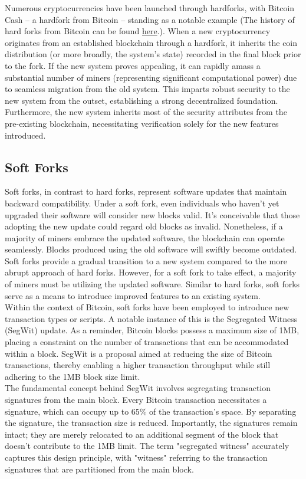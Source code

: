 Numerous cryptocurrencies have been launched through hardforks, with Bitcoin Cash – a hardfork from Bitcoin – standing as a notable example (The history of hard forks from Bitcoin can be found \href{https://www.investopedia.com/tech/history-bitcoin-hard-forks/}{here}.). When a new cryptocurrency originates from an established blockchain through a hardfork, it inherits the coin distribution (or more broadly, the system's state) recorded in the final block prior to the fork. If the new system proves appealing, it can rapidly amass a substantial number of miners (representing significant computational power) due to seamless migration from the old system. This imparts robust security to the new system from the outset, establishing a strong decentralized foundation. Furthermore, the new system inherits most of the security attributes from the pre-existing blockchain, necessitating verification solely for the new features introduced.
\subsection{Soft Forks}
Soft forks, in contrast to hard forks, represent software updates that maintain backward compatibility. Under a soft fork, even individuals who haven't yet upgraded their software will consider new blocks valid. It's conceivable that those adopting the new update could regard old blocks as invalid. Nonetheless, if a majority of miners embrace the updated software, the blockchain can operate seamlessly. Blocks produced using the old software will swiftly become outdated. Soft forks provide a gradual transition to a new system compared to the more abrupt approach of hard forks. However, for a soft fork to take effect, a majority of miners must be utilizing the updated software. Similar to hard forks, soft forks serve as a means to introduce improved features to an existing system.\\
Within the context of Bitcoin, soft forks have been employed to introduce new transaction types or scripts. A notable instance of this is the Segregated Witness (SegWit) update. As a reminder, Bitcoin blocks possess a maximum size of 1MB, placing a constraint on the number of transactions that can be accommodated within a block. SegWit is a proposal aimed at reducing the size of Bitcoin transactions, thereby enabling a higher transaction throughput while still adhering to the 1MB block size limit.\\
The fundamental concept behind SegWit involves segregating transaction signatures from the main block. Every Bitcoin transaction necessitates a signature, which can occupy up to 65\% of the transaction's space. By separating the signature, the transaction size is reduced. Importantly, the signatures remain intact; they are merely relocated to an additional segment of the block that doesn't contribute to the 1MB limit. The term "segregated witness" accurately captures this design principle, with "witness" referring to the transaction signatures that are partitioned from the main block.
